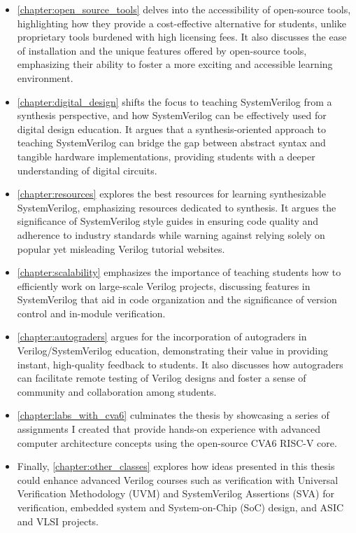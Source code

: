 \begin{itemize}

    \item \autoref{chapter:open_source_tools} delves into the accessibility of open-source tools, highlighting how they provide a cost-effective alternative for students, unlike proprietary tools burdened with high licensing fees. It also discusses the ease of installation and the unique features offered by open-source tools, emphasizing their ability to foster a more exciting and accessible learning environment.

    \item \autoref{chapter:digital_design} shifts the focus to teaching SystemVerilog from a synthesis perspective, and how SystemVerilog can be effectively used for digital design education. It argues that a synthesis-oriented approach to teaching SystemVerilog can bridge the gap between abstract syntax and tangible hardware implementations, providing students with a deeper understanding of digital circuits.

    \item \autoref{chapter:resources} explores the best resources for learning synthesizable SystemVerilog, emphasizing resources dedicated to synthesis. It argues the significance of SystemVerilog style guides in ensuring code quality and adherence to industry standards while warning against relying solely on popular yet misleading Verilog tutorial websites.

    \item \autoref{chapter:scalability} emphasizes the importance of teaching students how to efficiently work on large-scale Verilog projects, discussing features in SystemVerilog that aid in code organization and the significance of version control and in-module verification.

    \item \autoref{chapter:autograders} argues for the incorporation of autograders in Verilog/SystemVerilog education, demonstrating their value in providing instant, high-quality feedback to students. It also discusses how autograders can facilitate remote testing of Verilog designs and foster a sense of community and collaboration among students.

    \item \autoref{chapter:labs_with_cva6} culminates the thesis by showcasing a series of assignments I created that provide hands-on experience with advanced computer architecture concepts using the open-source CVA6 RISC-V core.

    \item Finally, \autoref{chapter:other_classes} explores how ideas presented in this thesis could enhance advanced Verilog courses such as verification with Universal Verification Methodology (UVM) and SystemVerilog Assertions (SVA) for verification, embedded system and System-on-Chip (SoC) design, and ASIC and VLSI projects.

\end{itemize}
